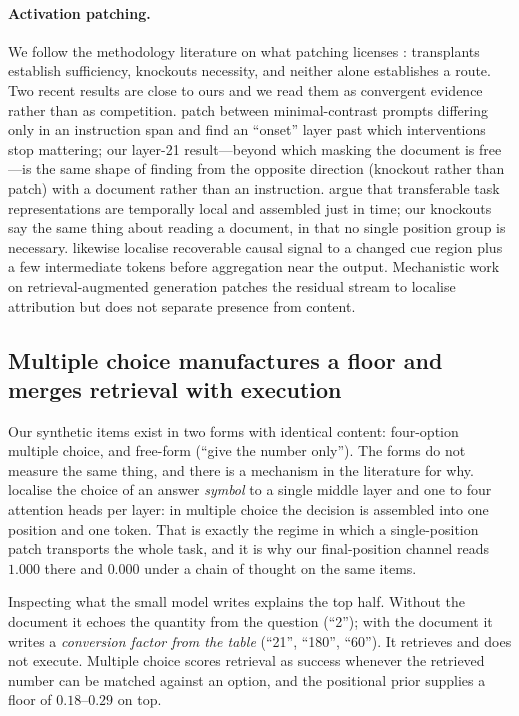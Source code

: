 \documentclass{article}
\begin{document}
\paragraph{Activation patching.}
We follow the methodology literature on what patching licenses
\citep{zhang2023bestpractices, heimersheim2024patching}: transplants establish
sufficiency, knockouts necessity, and neither alone establishes a route. Two
recent results are close to ours and we read them as convergent evidence rather
than as competition. \citet{onset2025instruction} patch between minimal-contrast
prompts differing only in an instruction span and find an ``onset'' layer past
which interventions stop mattering; our layer-21 result---beyond which masking
the document is free---is the same shape of finding from the opposite direction
(knockout rather than patch) with a document rather than an instruction.
\citet{jit2025taskrepr} argue that transferable task representations are
temporally local and assembled just in time; our knockouts say the same thing
about reading a document, in that no single position group is necessary.
\citet{semanticconflicts2026} likewise localise recoverable causal signal to a
changed cue region plus a few intermediate tokens before aggregation near the
output. Mechanistic work on retrieval-augmented generation
\citep{ragcite2026} patches the residual stream to localise attribution but
does not separate presence from content.


\subsection{Multiple choice manufactures a floor and merges retrieval with
execution}
\label{sec:format}

Our synthetic items exist in two forms with identical content: four-option
multiple choice, and free-form (``give the number only''). The forms do not
measure the same thing, and there is a mechanism in the literature for why.
\citet{wiegreffe2025mcq} localise the choice of an answer \emph{symbol} to a
single middle layer and one to four attention heads per layer: in multiple
choice the decision is assembled into one position and one token. That is
exactly the regime in which a single-position patch transports the whole task,
and it is why our final-position channel reads $1.000$ there and $0.000$ under a
chain of thought on the same items.



Inspecting what the small model writes explains the top half. Without the
document it echoes the quantity from the question (``2''); with the document it
writes a \emph{conversion factor from the table} (``21'', ``180'', ``60''). It
retrieves and does not execute. Multiple choice scores retrieval as success
whenever the retrieved number can be matched against an option, and the
positional prior supplies a floor of $0.18$--$0.29$ on top.
\end{document}
